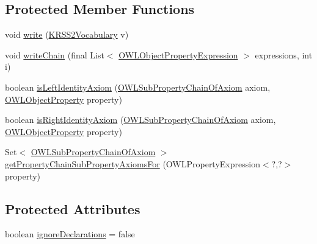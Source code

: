 \subsection*{Protected Member Functions}
\begin{DoxyCompactItemize}
\item 
void \hyperlink{classde_1_1uulm_1_1ecs_1_1ai_1_1owlapi_1_1krssrenderer_1_1_k_r_s_s2_object_renderer_a42244e9fc48773234583d6bd807f76bf}{write} (\hyperlink{enumde_1_1uulm_1_1ecs_1_1ai_1_1owlapi_1_1krssrenderer_1_1_k_r_s_s2_vocabulary}{K\-R\-S\-S2\-Vocabulary} v)
\item 
void \hyperlink{classde_1_1uulm_1_1ecs_1_1ai_1_1owlapi_1_1krssrenderer_1_1_k_r_s_s2_object_renderer_a272ad61c444652bb9b7a90588cb74bbe}{write\-Chain} (final List$<$ \hyperlink{interfaceorg_1_1semanticweb_1_1owlapi_1_1model_1_1_o_w_l_object_property_expression}{O\-W\-L\-Object\-Property\-Expression} $>$ expressions, int i)
\item 
boolean \hyperlink{classde_1_1uulm_1_1ecs_1_1ai_1_1owlapi_1_1krssrenderer_1_1_k_r_s_s2_object_renderer_ace50790569c80a562d596ed25bfeca39}{is\-Left\-Identity\-Axiom} (\hyperlink{interfaceorg_1_1semanticweb_1_1owlapi_1_1model_1_1_o_w_l_sub_property_chain_of_axiom}{O\-W\-L\-Sub\-Property\-Chain\-Of\-Axiom} axiom, \hyperlink{interfaceorg_1_1semanticweb_1_1owlapi_1_1model_1_1_o_w_l_object_property}{O\-W\-L\-Object\-Property} property)
\item 
boolean \hyperlink{classde_1_1uulm_1_1ecs_1_1ai_1_1owlapi_1_1krssrenderer_1_1_k_r_s_s2_object_renderer_a6e89adba3fe7fa2e026fc81fcd00b543}{is\-Right\-Identity\-Axiom} (\hyperlink{interfaceorg_1_1semanticweb_1_1owlapi_1_1model_1_1_o_w_l_sub_property_chain_of_axiom}{O\-W\-L\-Sub\-Property\-Chain\-Of\-Axiom} axiom, \hyperlink{interfaceorg_1_1semanticweb_1_1owlapi_1_1model_1_1_o_w_l_object_property}{O\-W\-L\-Object\-Property} property)
\item 
Set$<$ \hyperlink{interfaceorg_1_1semanticweb_1_1owlapi_1_1model_1_1_o_w_l_sub_property_chain_of_axiom}{O\-W\-L\-Sub\-Property\-Chain\-Of\-Axiom} $>$ \hyperlink{classde_1_1uulm_1_1ecs_1_1ai_1_1owlapi_1_1krssrenderer_1_1_k_r_s_s2_object_renderer_a247f0fb836d6b0fe95d2dabe20d97eca}{get\-Property\-Chain\-Sub\-Property\-Axioms\-For} (O\-W\-L\-Property\-Expression$<$?,?$>$ property)
\end{DoxyCompactItemize}
\subsection*{Protected Attributes}
\begin{DoxyCompactItemize}
\item 
boolean \hyperlink{classde_1_1uulm_1_1ecs_1_1ai_1_1owlapi_1_1krssrenderer_1_1_k_r_s_s2_object_renderer_a26ebca229892f797561346db5d8360d8}{ignore\-Declarations} = false
\end{DoxyCompactItemize}
